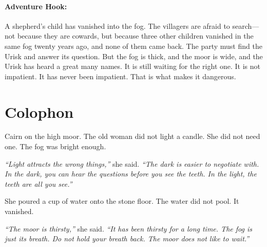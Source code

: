 \paragraph{Adventure Hook:}
A shepherd's child has vanished into the fog. The villagers are afraid to search---not because they are cowards, but because three other children vanished in the same fog twenty years ago, and none of them came back. The party must find the Urisk and answer its question. But the fog is thick, and the moor is wide, and the Urisk has heard a great many names. It is still waiting for the right one. It is not impatient. It has never been impatient. That is what makes it dangerous.

\section*{Colophon}
Cairn on the high moor. The old woman did not light a candle. She did not need one. The fog was bright enough.

\textit{``Light attracts the wrong things,''} she said. \textit{``The dark is easier to negotiate with. In the dark, you can hear the questions before you see the teeth. In the light, the teeth are all you see.''}

She poured a cup of water onto the stone floor. The water did not pool. It vanished.

\textit{``The moor is thirsty,''} she said. \textit{``It has been thirsty for a long time. The fog is just its breath. Do not hold your breath back. The moor does not like to wait.''}